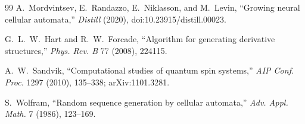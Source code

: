 \documentclass[11pt,a4paper]{article}
\theoremstyle{remark}
\begin{document}
\begin{thebibliography}{99}
A.~Mordvintsev, E.~Randazzo, E.~Niklasson, and M.~Levin,
``Growing neural cellular automata,''
\emph{Distill} (2020), doi:10.23915/distill.00023.

G.~L.~W.~Hart and R.~W.~Forcade,
``Algorithm for generating derivative structures,''
\emph{Phys. Rev. B} 77 (2008), 224115.

A.~W.~Sandvik,
``Computational studies of quantum spin systems,''
\emph{AIP Conf. Proc.} 1297 (2010), 135--338; arXiv:1101.3281.

S.~Wolfram,
``Random sequence generation by cellular automata,''
\emph{Adv. Appl. Math.} 7 (1986), 123--169.

\end{thebibliography}
\end{document}
